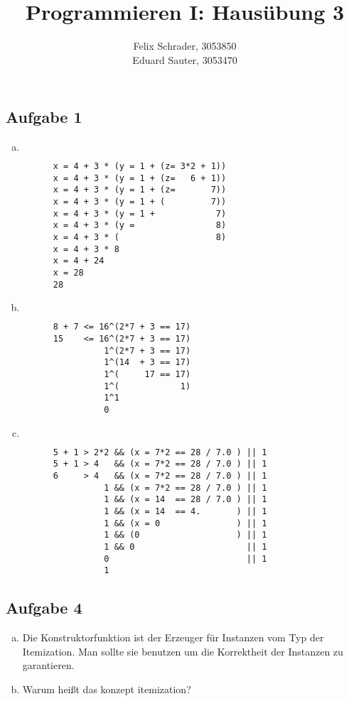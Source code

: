 \documentclass[11pt]{article}
\author{Felix Schrader, 3053850 \\
      Eduard Sauter, 3053470 }
\title{Programmieren I: Haus\"ubung 3}
\begin{document}
\maketitle
\subsection*{Aufgabe 1}
\begin{enumerate}[a)]
  \item $ $ %
    \begin{lstlisting}
      x = 4 + 3 * (y = 1 + (z= 3*2 + 1))
      x = 4 + 3 * (y = 1 + (z=   6 + 1))
      x = 4 + 3 * (y = 1 + (z=       7))
      x = 4 + 3 * (y = 1 + (         7))
      x = 4 + 3 * (y = 1 +            7)
      x = 4 + 3 * (y =                8)
      x = 4 + 3 * (                   8)
      x = 4 + 3 * 8
      x = 4 + 24                         
      x = 28                            
      28                            
    \end{lstlisting}
  \item $ $
    \begin{lstlisting}
      8 + 7 <= 16^(2*7 + 3 == 17)
      15    <= 16^(2*7 + 3 == 17)
                1^(2*7 + 3 == 17)
                1^(14  + 3 == 17)
                1^(     17 == 17)
                1^(            1)
                1^1               
                0                 
    \end{lstlisting}
  \item $ $
    \begin{lstlisting}
      5 + 1 > 2*2 && (x = 7*2 == 28 / 7.0 ) || 1
      5 + 1 > 4   && (x = 7*2 == 28 / 7.0 ) || 1
      6     > 4   && (x = 7*2 == 28 / 7.0 ) || 1
                1 && (x = 7*2 == 28 / 7.0 ) || 1
                1 && (x = 14  == 28 / 7.0 ) || 1
                1 && (x = 14  == 4.       ) || 1
                1 && (x = 0               ) || 1
                1 && (0                   ) || 1
                1 && 0                      || 1
                0                           || 1
                1
    \end{lstlisting}
  
  
\end{enumerate} 

\subsection*{Aufgabe 4}
\begin{enumerate}[a)]
  \item
    Die Konstruktorfunktion ist der Erzeuger f\"ur Instanzen vom Typ
    der Itemization. Man sollte sie benutzen um die Korrektheit der Instanzen
    zu garantieren.
  \item
    Warum hei\ss{}t das konzept itemization?
    
\end{enumerate}
\end{document}
